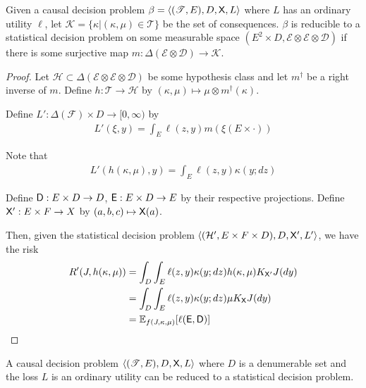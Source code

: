 \begin{lemma}\label{lem:red_cdp}
Given a causal decision problem $\beta=\langle (\mathscr{T},E),D,\mathsf{X},L\rangle$ where $L$ has an ordinary utility $\ell$, let $\mathscr{K}=\{\kappa|(\kappa,\mu)\in \mathscr{T}\}$ be the set of consequences. $\beta$ is reducible to a statistical decision problem on some measurable space $(E^2\times D,\mathcal{E}\otimes \mathcal{E}\otimes \mathcal{D})$ if there is some surjective map $m:\Delta(\mathcal{E}\otimes\mathcal{D})\to \mathscr{K}$.
\end{lemma}

\begin{proof}
Let $\mathcal{H}\subset \Delta(\mathcal{E}\otimes \mathcal{E}\otimes \mathcal{D})$ be some hypothesis class and let $m^\dagger$ be a right inverse of $m$. Define $h:\mathscr{T}\to \mathcal{H}$ by $(\kappa,\mu)\mapsto \mu \otimes m^{\dagger}(\kappa)$.

Define $L':\Delta(\mathcal{F})\times D\to [0,\infty)$ by
\begin{align}
    L'(\xi,y) = \int_E \ell(z,y) m(\xi(E\times \cdot))
\end{align}

Note that
\begin{align}
    L'(h(\kappa,\mu),y) = \int_E \ell(z,y) \kappa(y;dz)
\end{align}

Define $\mathsf{D}:E\times D\to D$, $\mathsf{E}:E\times D\to E$ by their respective projections. Define $\mathsf{X}':E\times F\to X$ by $(a,b,c)\mapsto \mathsf{X}(a)$.

Then, given the statistical decision problem $\langle(\mathcal{H}',E\times F\times D),D,\mathsf{X}',L'\rangle$, we have the risk
\begin{align}
    R'(J,h(\kappa,\mu)) &= \int_D \int_E \ell(z,y) \kappa(y;dz)  h(\kappa,\mu) K_{\mathsf{X}'} J(dy) \\
                  &= \int_D \int_E \ell(z,y) \kappa(y;dz) \mu K_{\mathsf{X}} J(dy)\\
                      &= \mathbb{E}_{f(J,\kappa,\mu)}[\ell(\mathsf{E},\mathsf{D})]
\end{align}
\end{proof}

\begin{theorem}\label{th:cdp_to_sdp}
A causal decision problem $\langle (\mathscr{T},E),D,\mathsf{X},L\rangle$ where $D$ is a denumerable set and the loss $L$ is an ordinary utility can be reduced to a statistical decision problem.
\end{theorem}

